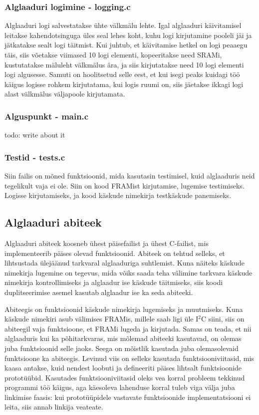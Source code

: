 \documentclass[12pt,a4paper]{article}
\newcommand{\iic}{I${}^2$C }
\begin{document}
\subsubsection{Alglaaduri logimine - \textbf{logging.c}}
Alglaaduri logi salvestatakse ühte välkmälu lehte. Igal alglaaduri käivitamisel
leitakse kahendotsinguga üles seal lehes koht, kuhu logi kirjutamine pooleli jäi
ja jätkatakse sealt logi täitmist. Kui juhtub, et käivitamise hetkel on logi
peaaegu täis, siis võetakse viimased 10 logi elementi, kopeeritakse need SRAMi,
kustutatakse mäluleht välkmälus ära, ja siis kirjutatakse need 10 logi elementi
logi algusesse. Samuti on hoolitsetud selle eest, et kui isegi peaks kuidagi töö
käigus logisse rohkem kirjutatama, kui logis ruumi on, siis jäetakse ikkagi logi
alast välkmälus väljapoole kirjutamata.

\subsubsection{Alguspunkt - \textbf{main.c}}
todo: write about it

\subsubsection{Testid - \textbf{tests.c}}
Siin failis on mõned funktsioonid, mida kasutasin testimisel, kuid alglaaduris
neid tegelikult vaja ei ole. Siin on kood FRAMist kirjutamise, lugemise
testimiseks. Logisse kirjutamiseks, ja kood käskude nimekirja testkäskude
panemiseks.

\subsection{Alglaaduri abiteek}
Alglaaduri abiteek koosneb ühest päisefailist ja ühest C-failist, mis
implementeerib päises olevad funktsioonid. Abiteek on tehtud selleks, et
lihtsustada ülejäänud tarkvaral alglaaduriga suhtlemist. Kuna näiteks käskude
nimekirja lugemine on tegevus, mida võiks saada teha välimine tarkvara käskude
nimekirja kontrollimiseks ja alglaadur ise käskude täitmiseks, siis koodi
duplitseerimise asemel kasutab alglaadur ise ka seda abiteeki.

Abiteegis on funktsioonid käskude nimekirja lugemiseks ja muutmiseks. Kuna
käskude nimekiri asub välimises FRAMis, millele saab ligi üle \iic siini, siis
on abiteegil vaja funktsioone, et FRAMi lugeda ja kirjutada. Samas on teada, et
nii alglaaduris kui ka põhitarkvaras, mis mõlemad abiteeki kasutavad, on olemas
juba funktsioonid selle jaoks. Seega on mõistlik kasutada juba olemasolevaid
funktsioone ka abiteegis. Levinud viis on selleks kasutada funktsiooniviitasid,
mis kaasa antakse, kuid nendest loobuti ja defineeriti päises lihtsalt
funktsioonide prototüübid. Kasutades funktsiooniviitasid oleks vea korral
probleem tekkinud programmi töö käigus, aga käesoleva lahenduse korral tuleb
viga välja juba linkimise faasis: kui prototüüpidele vastavate funktsioonide
implementatsiooni ei leita, siis annab linkija veateate.
\end{document}
